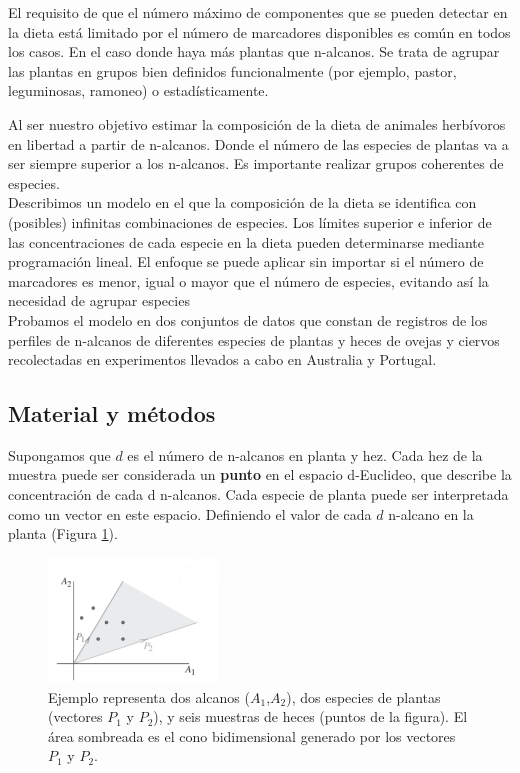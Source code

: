 \documentclass[11pt]{article}
\begin{document}
El requisito de que el número máximo de componentes que se pueden detectar en la dieta está limitado por el número de marcadores disponibles es común en todos los casos. En el caso donde haya más plantas que n-alcanos. Se trata de agrupar las plantas en grupos bien definidos funcionalmente (por ejemplo, pastor, leguminosas, ramoneo) o estadísticamente.

Al ser nuestro objetivo estimar la composición de la dieta de animales herbívoros en libertad a partir de n-alcanos. Donde el número de las especies de plantas va a ser siempre superior a los n-alcanos. Es importante realizar grupos coherentes de especies.\\
Describimos un modelo en el que la composición de la dieta se identifica con (posibles) infinitas combinaciones de especies. Los límites superior e inferior de las concentraciones de cada especie  en la dieta pueden determinarse mediante programación lineal. El enfoque se puede aplicar sin importar si el número de marcadores es menor, igual o mayor que el número de especies, evitando así la necesidad de agrupar especies\\
Probamos el modelo en dos conjuntos de datos que constan de
registros de los perfiles de n-alcanos de diferentes especies de plantas y heces de ovejas y ciervos recolectadas en experimentos llevados a cabo en Australia y Portugal. 

\subsection{Material y métodos}

Supongamos que $d$ es el número de n-alcanos en planta y hez. Cada hez de la muestra puede ser considerada un \textbf{punto} en el espacio d-Euclideo, que describe la concentración de cada d n-alcanos. Cada especie de planta puede ser interpretada como un vector en este espacio. Definiendo el valor de cada $d$ n-alcano en la planta (Figura \ref{fig:espacio01}).

\begin{figure}[h!] 
\centering
    \includegraphics[width=0.4\textwidth]{espacio01.png}
\caption{Ejemplo representa dos alcanos ($A_1$,$A_2$), dos especies de plantas (vectores $P_1$ y $P_2$), y seis muestras de heces (puntos de la figura). El área sombreada es el cono bidimensional generado por los vectores $P_1$ y $P_2$.}
\label{fig:espacio01}
\end{figure}
\end{document}

